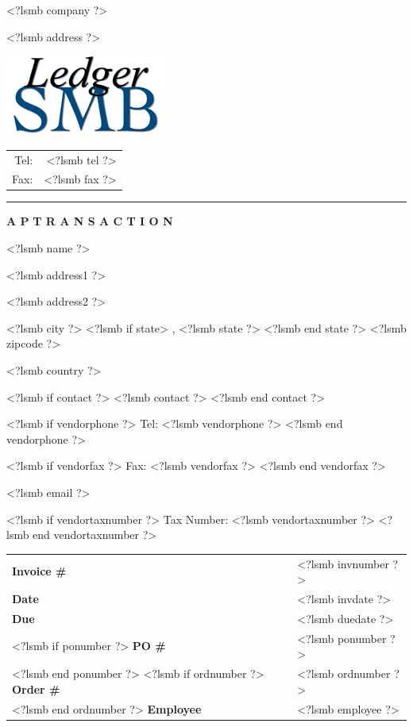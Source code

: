 \documentclass{scrartcl}
\begin{document}
\pagestyle{empty}

\fontsize{10pt}{12pt}\selectfont

\parbox{\textwidth}{%
  \parbox[b]{.42\textwidth}{%
    <?lsmb company ?>
   
    <?lsmb address ?>
  }
  \parbox[b]{.2\textwidth}{
    \includegraphics[scale=0.3]{ledger-smb}
  }\hfill
  \begin{tabular}[b]{rr@{}}
  Tel: & <?lsmb tel ?>\\
  Fax: & <?lsmb fax ?>
  \end{tabular}

  \rule[1.5em]{\textwidth}{0.5pt}
}

\centerline{\textbf{A P} \hspace{0.3cm} \textbf{T R A N S A C T I O N}}

\vspace*{0.5cm}

\parbox[t]{.5\textwidth}{
<?lsmb name ?>

<?lsmb address1 ?>

<?lsmb address2 ?>

<?lsmb city ?>
<?lsmb if state>
, <?lsmb state ?>
<?lsmb end state ?> <?lsmb zipcode ?>

<?lsmb country ?>

\vspace{0.3cm}

<?lsmb if contact ?>
<?lsmb contact ?>
<?lsmb end contact ?>

\vspace{0.2cm}

<?lsmb if vendorphone ?>
Tel: <?lsmb vendorphone ?>
<?lsmb end vendorphone ?>

<?lsmb if vendorfax ?>
Fax: <?lsmb vendorfax ?>
<?lsmb end vendorfax ?>

<?lsmb email ?>

<?lsmb if vendortaxnumber ?>
Tax Number: <?lsmb vendortaxnumber ?>
<?lsmb end vendortaxnumber ?>
}
\hfill
\begin{tabular}[t]{ll}
  \textbf{Invoice \#} & <?lsmb invnumber ?> \\
  \textbf{Date} & <?lsmb invdate ?> \\
  \textbf{Due} & <?lsmb duedate ?> \\
  <?lsmb if ponumber ?>
    \textbf{PO \#} & <?lsmb ponumber ?> \\
  <?lsmb end ponumber ?>
  <?lsmb if ordnumber ?>
    \textbf{Order \#} & <?lsmb ordnumber ?> \\
  <?lsmb end ordnumber ?>
  \textbf{Employee} & <?lsmb employee ?> \\
\end{tabular}
\end{document}
